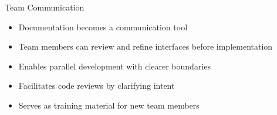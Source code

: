 \begin{frame}{Team Communication}
	\begin{itemize}
		\item Documentation becomes a communication tool
		\item Team members can review and refine interfaces before implementation
		\item Enables parallel development with clearer boundaries
		\item Facilitates code reviews by clarifying intent
		\item Serves as training material for new team members
	\end{itemize}
\end{frame}
